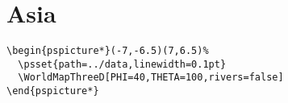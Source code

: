 \documentclass[12pt,a4paper]{article} %
\begin{document}
\section*{Asia}
\begin{verbatim}
\begin{pspicture*}(-7,-6.5)(7,6.5)%
  \psset{path=../data,linewidth=0.1pt}
  \WorldMapThreeD[PHI=40,THETA=100,rivers=false]
\end{pspicture*}
\end{verbatim}

%
\end{document}
